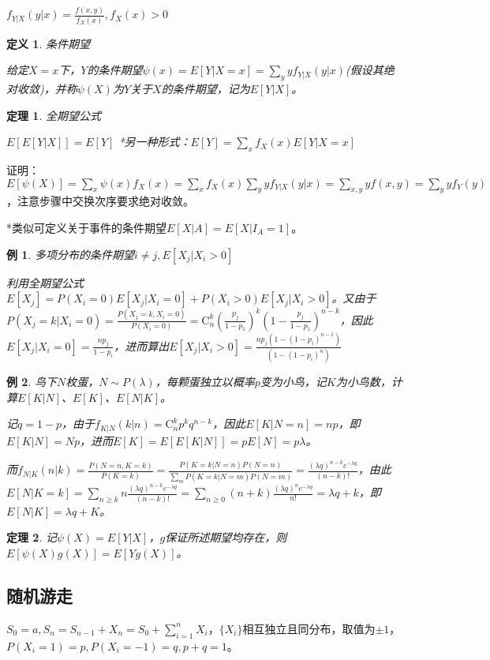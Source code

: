 \documentclass[a4paper,UTF8,fontset=windows]{ctexart}
\newtheorem{thm}{定理}[section]
\newtheorem{exmp}{例}[section]
\newtheorem{defi}{定义}[section]
\begin{document}
$f_{Y|X}(y|x)=\frac{f(x,y)}{f_X(x)},f_X(x)>0$

\begin{defi} 条件期望

给定$X=x$下，$Y$的条件期望$\psi(x)=E[Y|X=x]=\sum_yyf_{Y|X}(y|x)$(假设其绝对收敛)，并称$\psi(X)$为$Y$关于$X$的条件期望，记为$E[Y|X]$。
\end{defi}

\begin{thm} 全期望公式

$E[E[Y|X]]=E[Y]$ *另一种形式：$E[Y]=\sum_xf_X(x)E[Y|X=x]$
\end{thm}

证明：$E[\psi(X)]=\sum_x\psi(x)f_X(x)=\sum_xf_X(x)\sum_yyf_{Y|X}(y|x)=\sum_{x,y}yf(x,y)=\sum_yyf_Y(y)$，注意步骤中交换次序要求绝对收敛。

*类似可定义关于事件的条件期望$E[X|A]=E[X|I_A=1]$。

\begin{exmp} 多项分布的条件期望$i\neq j,E[X_j|X_i>0]$

利用全期望公式$E[X_j]=P(X_i=0)E[X_j|X_i=0]+P(X_i>0)E[X_j|X_i>0]$。又由于$P(X_j=k|X_i=0)=\frac{P(X_j=k,X_i=0)}{P(X_i=0)}=\mathrm{C}_n^k\left(\frac{p_j}{1-p_1}\right)^k\left(1-\frac{p_j}{1-p_1}\right)^{n-k}$，因此$E[X_j|X_i=0]=\frac{np_j}{1-p_i}$，进而算出$E[X_j|X_i>0]=\frac{np_j(1-(1-p_i)^{n-1})}{(1-(1-p_i)^n)}$
\end{exmp}

\begin{exmp}
鸟下$N$枚蛋，$N\sim P(\lambda)$，每颗蛋独立以概率$p$变为小鸟，记$K$为小鸟数，计算$E[K|N]$、$E[K]$、$E[N|K]$。

记$q=1-p$，由于$f_{K|N}(k|n)=\mathrm{C}_n^kp^kq^{n-k}$，因此$E[K|N=n]=np$，即$E[K|N]=Np$，进而$E[K]=E[E[K|N]]=pE[N]=p\lambda$。

而$f_{N|K}(n|k)=\frac{P(N=n,K=k)}{P(K=k)}=\frac{P(K=k|N=n)P(N=n)}{\sum_mP(K=k|N=m)P(N=m)}=\frac{(\lambda q)^{n-k}e^{-\lambda q}}{(n-k)!}$，由此$E[N|K=k]=\sum_{n\ge k}n\frac{(\lambda q)^{n-k}e^{-\lambda q}}{(n-k)!}=\sum_{n\ge 0}(n+k)\frac{(\lambda q)^ne^{-\lambda q}}{n!}=\lambda q+k$，即$E[N|K]=\lambda q+K$。
\end{exmp}

\begin{thm}
记$\psi(X)=E[Y|X]$，$g$保证所述期望均存在，则$E[\psi(X)g(X)]=E[Yg(X)]$。
\end{thm}

\subsection{随机游走}
$S_0=a,S_n=S_{n-1}+X_n=S_0+\sum_{i=1}^nX_i$，$\{X_i\}$相互独立且同分布，取值为$\pm1$，$P(X_i=1)=p,P(X_i=-1)=q,p+q=1$。
\end{document}
